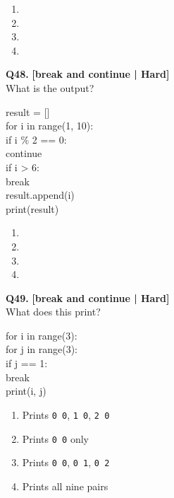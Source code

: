 \begin{enumerate}[label=(\alph*),topsep=2pt,itemsep=1pt,partopsep=0pt,parsep=0pt]
    \item {}
    \item {}
    \item {}
    \item {}
\end{enumerate}
\vspace{2mm}

\noindent\textbf{Q48.} \hfill {\small\color{LPUOrange}\textbf{[break and continue | Hard]}}\\[2pt]
What is the output? 

\begin{pycode}
result = []\\
for i in range(1, 10):\\
if i \% 2 == 0:\\
continue\\
if i > 6:\\
break\\
result.append(i)\\
print(result)
\end{pycode}

\begin{enumerate}[label=(\alph*),topsep=2pt,itemsep=1pt,partopsep=0pt,parsep=0pt]
    \item \relax [1, 2, 3, 4, 5]
    \item \relax [1, 3, 5]
    \item \relax [1, 3, 5, 7]
    \item \relax [1, 3, 5, 7, 9]
\end{enumerate}
\vspace{2mm}

\noindent\textbf{Q49.} \hfill {\small\color{LPUOrange}\textbf{[break and continue | Hard]}}\\[2pt]
What does this print? 

\begin{pycode}
for i in range(3):\\
for j in range(3):\\
if j == 1:\\
break\\
print(i, j)
\end{pycode}

\begin{enumerate}[label=(\alph*),topsep=2pt,itemsep=1pt,partopsep=0pt,parsep=0pt]
    \item \relax Prints \texttt{0 0}, \texttt{1 0}, \texttt{2 0}
    \item \relax Prints \texttt{0 0} only
    \item \relax Prints \texttt{0 0}, \texttt{0 1}, \texttt{0 2}
    \item \relax Prints all nine pairs
\end{enumerate}
\vspace{2mm}

